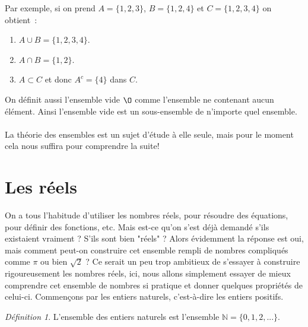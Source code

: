 \documentclass[oneside,12pt,french,table]{book}
\theoremstyle{definition}
\theoremstyle{plain}
\theoremstyle{remark}
\newtheorem{defi}[definition]{Définition}
\newcommand{\Nn}{{\mathbb{N}}}
\begin{document}
Par exemple, si on prend $A=\{1,2,3\}$, $B=\{1,2,4\}$ et $C=\{1,2,3,4\}$ on obtient :
\begin{enumerate}
    \item $A\cup B=\{1,2,3,4\}$.
    \item $A\cap B=\{1,2\}$.
    \item $A\subset C$ et donc $A^c=\{4\}$ dans $C$.
\end{enumerate}
On définit aussi l'ensemble vide $\O$ comme l'ensemble ne contenant aucun élément. Ainsi l'ensemble vide est un sous-ensemble de n'importe quel ensemble.\\\\
La théorie des ensembles est un sujet d'étude à elle seule, mais pour le moment cela nous suffira pour comprendre la suite!


\section{Les réels}
On a tous l'habitude d'utiliser les nombres réels, pour résoudre des équations, pour définir des fonctions, etc. Mais est-ce qu'on s'est déjà demandé s'ils existaient vraiment ? S'ils sont bien "réels" ? Alors évidemment la réponse est oui, mais comment peut-on construire cet ensemble rempli de nombres compliqués comme $\pi$ ou bien $\sqrt{2}$ ? Ce serait un peu trop ambitieux de s'essayer à construire rigoureusement les nombres réels, ici, nous allons simplement essayer de mieux comprendre cet ensemble de nombres si pratique et donner quelques propriétés de celui-ci. Commençons par les entiers naturels, c'est-à-dire les entiers positifs. 
\begin{defi} L'ensemble des entiers naturels est l'ensemble $\Nn=\{0,1,2,...\}$. 
\end{defi}
\end{document}

